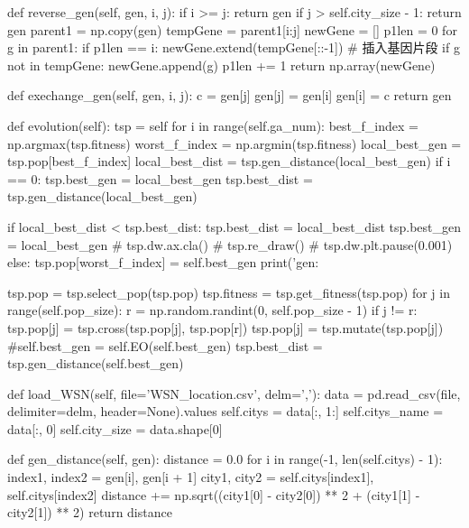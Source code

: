 \documentclass{ctexart}
\begin{document}
\begin{python}
    def reverse_gen(self, gen, i, j):
        if i >= j:
            return gen
        if j > self.city_size - 1:
            return gen
        parent1 = np.copy(gen)
        tempGene = parent1[i:j]
        newGene = []
        p1len = 0
        for g in parent1:
            if p1len == i:
                newGene.extend(tempGene[::-1])  # 插入基因片段
            if g not in tempGene:
                newGene.append(g)
            p1len += 1
        return np.array(newGene)

    def exechange_gen(self, gen, i, j):
        c = gen[j]
        gen[j] = gen[i]
        gen[i] = c
        return gen

    def evolution(self):
        tsp = self
        for i in range(self.ga_num):
            best_f_index = np.argmax(tsp.fitness)
            worst_f_index = np.argmin(tsp.fitness)
            local_best_gen = tsp.pop[best_f_index]
            local_best_dist = tsp.gen_distance(local_best_gen)
            if i == 0:
                tsp.best_gen = local_best_gen
                tsp.best_dist = tsp.gen_distance(local_best_gen)

            if local_best_dist < tsp.best_dist:
                tsp.best_dist = local_best_dist
                tsp.best_gen = local_best_gen
                # tsp.dw.ax.cla()
                # tsp.re_draw()
                # tsp.dw.plt.pause(0.001)
            else:
                tsp.pop[worst_f_index] = self.best_gen
            print('gen:%

            tsp.pop = tsp.select_pop(tsp.pop)
            tsp.fitness = tsp.get_fitness(tsp.pop)
            for j in range(self.pop_size):
                r = np.random.randint(0, self.pop_size - 1)
                if j != r:
                    tsp.pop[j] = tsp.cross(tsp.pop[j], tsp.pop[r])
                    tsp.pop[j] = tsp.mutate(tsp.pop[j])
            #self.best_gen = self.EO(self.best_gen)
            tsp.best_dist = tsp.gen_distance(self.best_gen)

    def load_WSN(self, file='WSN_location.csv', delm=','):
        data = pd.read_csv(file, delimiter=delm, header=None).values
        self.citys = data[:, 1:]
        self.citys_name = data[:, 0]
        self.city_size = data.shape[0]

    def gen_distance(self, gen):
        distance = 0.0
        for i in range(-1, len(self.citys) - 1):
            index1, index2 = gen[i], gen[i + 1]
            city1, city2 = self.citys[index1], self.citys[index2]
            distance += np.sqrt((city1[0] - city2[0]) ** 2 + (city1[1] - city2[1]) ** 2)
        return distance


\end{python}
\end{document}
